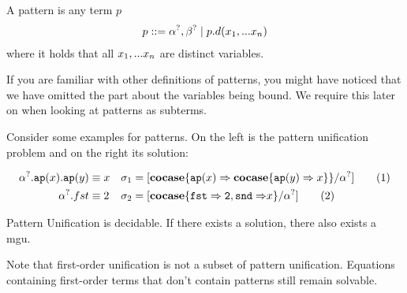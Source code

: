 \documentclass[twoside,12pt,a4paper]{article}
\begin{document}
\begin{definition}[Pattern]
    A pattern is any term $p$ 
    \begin{align*}
        p ::= \alpha^?, \beta^? \;|\; p.d(x_1,...x_n)
    \end{align*}
    where it holds that all $x_1,...x_n$ are distinct variables.
\end{definition}

If you are familiar with other definitions of patterns, you might have noticed that 
we have omitted the part about the variables being bound. We require this later on when looking at patterns as subterms.

Consider some examples for patterns. On the left is the pattern unification problem and on the right its solution:
\begin{example}
    \begin{align*}
        \alpha^?.\texttt{ap}(x).\texttt{ap}(y)&\equiv x &\sigma_1 &= [\textbf{cocase}\{\texttt{ap}(x)\Rightarrow\textbf{cocase}\{\texttt{ap}(y)\Rightarrow x\}\}/\alpha^?] \tag{1}\\
        \alpha^?.fst &\equiv 2 &\sigma_2 &= [\textbf{cocase}\{\mathtt{fst\Rightarrow 2, snd \Rightarrow}x\}/\alpha^?] \tag{2}
    \end{align*}   
\end{example}

\begin{theorem}
    Pattern Unification is decidable. If there exists a solution, there also exists a mgu.
\end{theorem}

Note that first-order unification is not a subset of pattern unification. 
Equations containing first-order terms that don't contain patterns still remain solvable.
\end{document}
